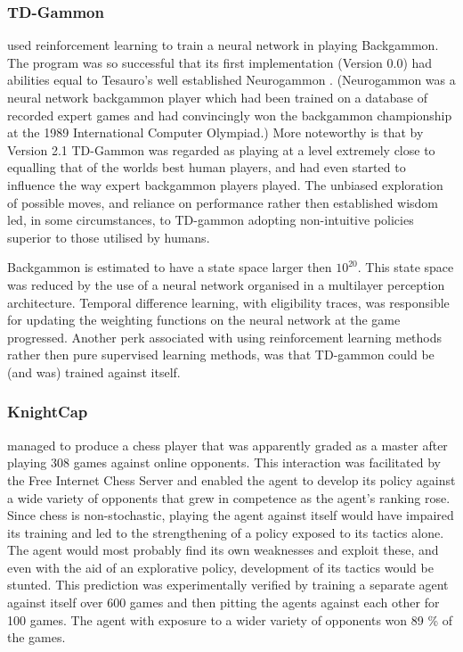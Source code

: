 \documentclass[a4paper]{article}%
\begin{document}
\subsubsection{TD-Gammon}

 \cite{tdgammon} used reinforcement learning to train a neural network in playing Backgammon. The program was so successful that its first implementation (Version 0.0) had abilities equal to Tesauro's well established Neurogammon \citep{tdgammon}. (Neurogammon was a neural network backgammon player which had been trained on a database of recorded expert games and had convincingly won the backgammon championship at the 1989 International Computer Olympiad.) More noteworthy is that by Version 2.1 TD-Gammon was regarded as playing at a level extremely close to equalling that of the worlds best human players, and had even started to influence the way expert backgammon players played\citep{tdgammon}. The unbiased exploration of possible moves, and reliance on performance rather then established wisdom led, in some circumstances, to TD-gammon adopting non-intuitive policies superior to those utilised by humans\citep{tdgammon}.

Backgammon is estimated to have a state space larger then $10^{20}$. This state space was reduced by the use of a neural network organised in a multilayer perception architecture. Temporal difference learning, with eligibility traces, was responsible for updating the weighting functions on the neural network at the game progressed. Another perk associated with using reinforcement learning methods rather then pure supervised learning methods, was that TD-gammon could be (and was) trained against itself\citep{tdgammon}.

\subsubsection{KnightCap}
\cite{baxter98knightcap} managed to produce a chess player that was apparently graded as a master after playing 308 games against online opponents. This interaction was facilitated by the Free Internet Chess Server and enabled the agent to develop its policy against a wide variety of opponents that grew in competence as the agent's ranking rose. Since chess is non-stochastic, playing the agent against itself would have impaired its training and led to the strengthening of a policy exposed to its tactics alone. The agent would most probably find its own weaknesses and exploit these, and even with the aid of an explorative policy, development of its tactics would be stunted. This prediction was experimentally verified by training a separate agent against itself over 600 games and then pitting the agents against each other for 100 games. The agent with exposure to a wider variety of opponents won 89 \% of the games\citep{baxter98knightcap}. 
\end{document}
